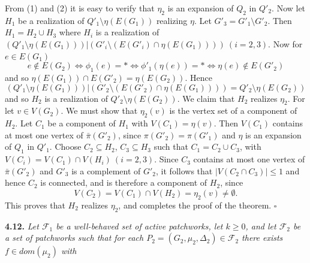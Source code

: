 From (1) and (2) it is easy to verify that $\eta_2$ is an expansion of $Q_2$ in $Q'_2$. Now let $H_1$ be a realization of $Q'_1 \setminus \eta(E(G_1))$ realizing $\eta$. Let $G'_3 = G'_1 \setminus G'_2$. Then $H_1 = H_2 \cup H_3$ where $H_i$ is a realization of $(Q'_1 \setminus \eta(E(G_1)))|(G'_i \setminus (E(G'_i) \cap \eta(E(G_1))))\ (i = 2, 3)$. Now for $e \in E(G_1)$
\begin{equation*}
e \notin E(G_2) \Leftrightarrow \phi_1(e) = * \Leftrightarrow \phi'_1(\eta(e)) = * \Leftrightarrow \eta(e) \notin E(G'_2)
\end{equation*}
and so $\eta(E(G_1)) \cap E(G'_2) = \eta(E(G_2))$. Hence
\begin{equation*}
(Q'_1 \setminus \eta(E(G_1)))|(G'_2 \setminus (E(G'_2) \cap \eta(E(G_1)))) = Q'_2 \setminus \eta(E(G_2))
\end{equation*}
and so $H_2$ is a realization of $Q'_2 \setminus \eta(E(G_2))$. We claim that $H_2$ realizes $\eta_2$. For let $v \in V(G_2)$. We must show that $\eta_2(v)$ is the vertex set of a component of $H_2$. Let $C_1$ be a component of $H_1$ with $V(C_1) = \eta(v)$. Then $V(C_1)$ contains at most one vertex of $\bar{\pi}(G'_2)$, since $\pi(G'_2) = \pi(G'_1)$ and $\eta$ is an expansion of $Q_1$ in $Q'_1$. Choose $C_2 \subseteq H_2$, $C_3 \subseteq H_3$ such that $C_1 = C_2 \cup C_3$, with $V(C_i) = V(C_1) \cap V(H_i)\ (i = 2, 3)$. Since $C_3$ contains at most one vertex of $\bar{\pi}(G'_2)$ and $G'_3$ is a complement of $G'_2$, it follows that $|V(C_2 \cap C_3)| \le 1$ and hence $C_2$ is connected, and is therefore a component of $H_2$, since
\begin{equation*}
V(C_2) = V(C_1) \cap V(H_2) = \eta_2(v) \ne \emptyset.
\end{equation*}
This proves that $H_2$ realizes $\eta_2$, and completes the proof of the theorem. $\square$

\textbf{4.12.} \textit{Let $\mathcal{F}_1$ be a well-behaved set of active patchworks, let $k \ge 0$, and let $\mathcal{F}_2$ be a set of patchworks such that for each $P_2 = (G_2, \mu_2, \Delta_2) \in \mathcal{F}_2$ there exists $f \in dom(\mu_2)$ with}
